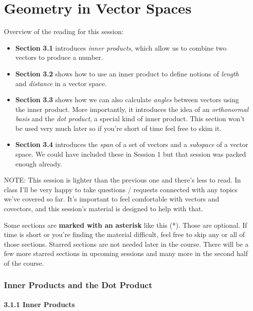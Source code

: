 \documentclass[oneside,english]{amsbook}
\numberwithin{section}{chapter}
\theoremstyle{plain}
\theoremstyle{definition}
\begin{document}
\chapter{Geometry in Vector Spaces}\label{geometry-in-vector-spaces}

Overview of the reading for this session:

\begin{itemize}
	\item
	\textbf{Section 3.1} introduces \emph{inner products}, which allow us
	to combine two vectors to produce a number.
	\item
	\textbf{Section 3.2} shows how to use an inner product to define
	notions of \emph{length} and \emph{distance} in a vector space.
	\item
	\textbf{Section 3.3} shows how we can also calculate \emph{angles}
	between vectors using the inner product. More importantly, it
	introduces the idea of an \emph{orthonormal basis} and the \emph{dot
		product}, a special kind of inner product. This section won't be used
	very much later so if you're short of time feel free to skim it.
	\item
	\textbf{Section 3.4} introduces the \emph{span} of a set of vectors
	and a \emph{subspace} of a vector space. We could have included these
	in Session 1 but that session was packed enough already.
\end{itemize}

NOTE: This session is lighter than the previous one and there's less to
read. In class I'll be very happy to take questions / requests connected
with any topics we've covered so far. It's important to feel comfortable
with vectors and covectors, and this session's material is designed to
help with that.

Some sections are \textbf{marked with an asterisk} like this (*). Those
are optional. If time is short or you're finding the material difficult,
feel free to skip any or all of those sections. Starred sections are not
needed later in the course. There will be a few more starred sections in
upcoming sessions and many more in the second half of the course.

\subsection{Inner Products and the Dot
	Product}\label{inner-products-and-the-dot-product}

\subsubsection{3.1.1 Inner Products}\label{inner-products}
\end{document}
